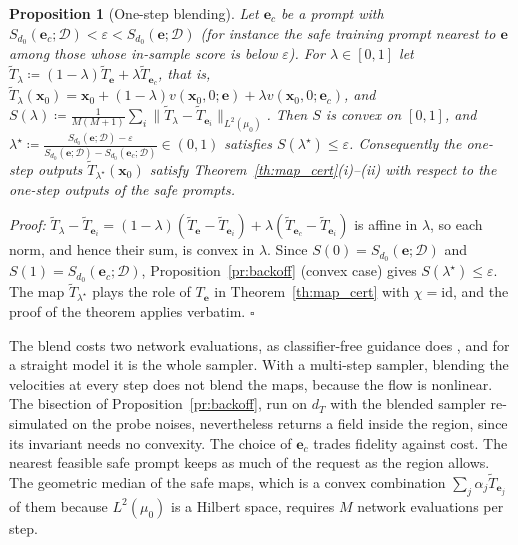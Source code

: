 \documentclass{article}
\newcommand{\cD}{\mathcal{D}}                       %
\newcommand{\bx}{\mathbf{x}}
\newcommand{\be}{\mathbf{e}}                       %
\theoremstyle{plain}
\newtheorem{proposition}{Proposition}
\begin{document}
\begin{proposition}[One-step blending]\label{pr:blend}
Let $\be_c$ be a prompt with $S_{d_0}(\be_c;\cD)<\varepsilon<S_{d_0}(\be;\cD)$ (for instance the safe
training prompt nearest to $\be$ among those whose in-sample score is below $\varepsilon$). For
$\lambda\in[0,1]$ let $\tilde T_\lambda\coloneqq(1-\lambda)\tilde T_{\be}+\lambda\tilde T_{\be_c}$, that is,
$\tilde T_\lambda(\bx_0)=\bx_0+(1-\lambda)v(\bx_0,0;\be)+\lambda v(\bx_0,0;\be_c)$, and
$S(\lambda)\coloneqq\frac{1}{M(M+1)}\sum_i\|\tilde T_\lambda-\tilde T_{\be_i}\|_{L^2(\mu_0)}$. Then $S$ is convex
on $[0,1]$, and
$\lambda^\star\coloneqq\frac{S_{d_0}(\be;\cD)-\varepsilon}{S_{d_0}(\be;\cD)-S_{d_0}(\be_c;\cD)}\in(0,1)$ satisfies
$S(\lambda^\star)\leq\varepsilon$. Consequently the one-step outputs $\tilde T_{\lambda^\star}(\bx_0)$ satisfy
Theorem~\ref{th:map_cert}(i)--(ii) with respect to the one-step outputs of the safe prompts.
\end{proposition}
\textit{Proof:}
$\tilde T_\lambda-\tilde T_{\be_i}=(1-\lambda)(\tilde T_{\be}-\tilde T_{\be_i})+\lambda(\tilde T_{\be_c}-\tilde T_{\be_i})$ is
affine in $\lambda$, so each norm, and hence their sum, is convex in $\lambda$. Since $S(0)=S_{d_0}(\be;\cD)$
and $S(1)=S_{d_0}(\be_c;\cD)$, Proposition~\ref{pr:backoff} (convex case) gives $S(\lambda^\star)\leq\varepsilon$.
The map $\tilde T_{\lambda^\star}$ plays the role of $T_{\be}$ in Theorem~\ref{th:map_cert} with $\chi=\mathrm{id}$,
and the proof of the theorem applies verbatim. \hfill $\square$

The blend costs two network evaluations, as classifier-free guidance does
\citep{ho2022classifier}, and for a straight model it is the whole sampler. With a multi-step sampler,
blending the velocities at every step does not blend the maps, because the flow is nonlinear.
The bisection of Proposition~\ref{pr:backoff}, run on $d_T$ with the blended sampler re-simulated on
the probe noises, nevertheless returns a field inside the region, since its invariant needs no
convexity. The choice of $\be_c$ trades fidelity against cost. The nearest feasible safe prompt keeps
as much of the request as the region allows. The geometric median of the safe maps, which is a
convex combination $\sum_j\alpha_j\tilde T_{\be_j}$ of them because $L^2(\mu_0)$ is a Hilbert space, requires
$M$ network evaluations per step.
\end{document}
